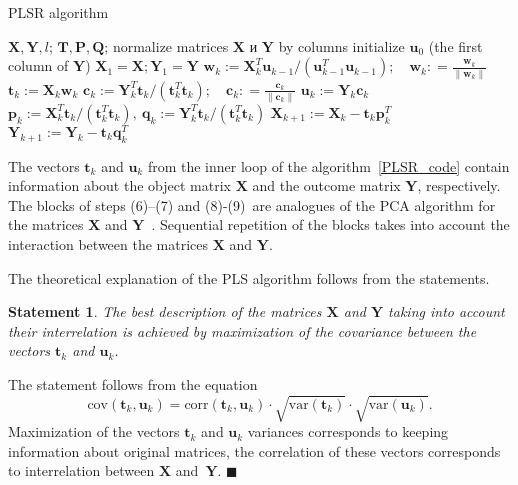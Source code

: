 \documentclass[12pt,twoside]{article}
\newtheorem{statement}{Statement}
\begin{document}
\begin{algorithm}[h]
\caption{PLSR algorithm}
\label{PLSR_code}
\begin{algorithmic}[1]
	\REQUIRE $\mathbf{X}, \mathbf{Y}, l$;
	\ENSURE $\mathbf{T}, \mathbf{P}, \mathbf{Q}$;
	\STATE normalize matrices $\mathbf{X}$ и $\mathbf{Y}$ by columns
	\STATE initialize $\mathbf{u}_0$ (the first column of $\mathbf{Y}$)
	\STATE $\mathbf{X}_1 = \mathbf{X}; \mathbf{Y}_1 = \mathbf{Y}$
	\REPEAT
	\vspace{0.1cm}
	\STATE $\mathbf{w}_k := \mathbf{X}_k^{T} \mathbf{u}_{k-1} / (\mathbf{u}_{k-1}^{T} \mathbf{u}_{k-1}); \quad \mathbf{w}_k: = \frac{\mathbf{w}_k}{\| \mathbf{w}_k \|}$
	\vspace{0.1cm}
	\STATE $\mathbf{t}_k := \mathbf{X}_k \mathbf{w}_k$
	\vspace{0.1cm}
	\STATE $\mathbf{c}_k := \mathbf{Y}_k^{T} \mathbf{t}_k / (\mathbf{t}_k^{T} \mathbf{t}_k); \quad \mathbf{c}_k: = \frac{\mathbf{c}_k}{\| \mathbf{c}_k \|}$
	\vspace{0.1cm}
	\STATE $\mathbf{u}_k := \mathbf{Y}_k \mathbf{c}_k$
	\vspace{0.1cm}
	\STATE $\mathbf{p}_k:= \mathbf{X}_k^{T}\mathbf{t}_k/(\mathbf{t}_k^{T}\mathbf{t}_k),\ 
	\mathbf{q}_k := \mathbf{Y}_k^{T}\mathbf{t}_k/(\mathbf{t}_k^{T}\mathbf{t}_k)$
	\vspace{0.2cm}
	\STATE $\mathbf{X}_{k+1} :=  \mathbf{X}_k - \mathbf{t}_k \mathbf{p}_k^{T}$
	\vspace{0.2cm}
	\STATE $\mathbf{Y}_{k + 1} :=  \mathbf{Y}_k - \mathbf{t}_k \mathbf{q}_k^{T}$ 
	\ENDFOR
\end{algorithmic}
\end{algorithm}

The vectors $\mathbf{t}_k$ and $\mathbf{u}_k$ from the inner loop of the algorithm~\ref{PLSR_code} contain information about the object matrix $\mathbf{X}$ and the outcome matrix $\mathbf{Y}$, respectively. 
The blocks of steps (6)--(7) and (8)-(9)~are analogues of the PCA algorithm for the matrices $\mathbf{X}$ and $\mathbf{Y}$~\cite{geladi1986partial}. 
Sequential repetition of the blocks takes into account the interaction between the matrices $\mathbf{X}$ and $\mathbf{Y}$.

The theoretical explanation of the PLS algorithm follows from the statements.
\begin{statement}
The best description of the matrices $\mathbf{X}$ and $\mathbf{Y}$ taking into account their interrelation is achieved by maximization of the covariance between the vectors $\mathbf{t}_k$ and $\mathbf{u}_k$.
\end{statement}
The statement follows from the equation
\[
\text{cov} (\mathbf{t}_k, \mathbf{u}_k) = \text{corr} (\mathbf{t}_k, \mathbf{u}_k) \cdot \sqrt{\text{var}(\mathbf{t}_k)} \cdot \sqrt{\text{var}(\mathbf{u}_k)}.
\]
Maximization of the vectors $\mathbf{t}_k$ and $\mathbf{u}_k$ variances corresponds to keeping information about original matrices, the correlation of these vectors corresponds to interrelation between $\mathbf{X}$ and~$\mathbf{Y}$. $\blacksquare$
\end{document}
